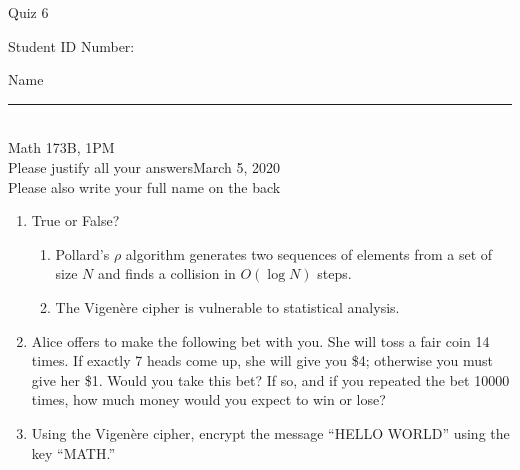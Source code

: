 \documentclass[12pt]{article}
\begin{document}
\begin{flushleft} 
\centerline{\LARGE{Quiz 6}} 
\vspace{5 mm}
{Student ID Number:}\hfill  
{Name \rule {2 in}{0.01in}}\\
Math 173B, 1PM
\\
{Please justify all your answers}\hfill {March 5, 2020}
\\
{Please also write your full name on the back} 

\medskip
\end{flushleft}

\begin{enumerate}
	\item True or False?
	\begin{enumerate}
		\item Pollard's $\rho$ algorithm generates two sequences of elements from a set of size $N$ and finds a collision in $O(\log N)$ steps.
		\item The Vigen\`ere cipher is vulnerable to statistical analysis.
	\end{enumerate}
	\item Alice offers to make the following bet with you. She will toss a fair coin 14 times. If exactly 7 heads come up, she will give you \$4; otherwise you must give her \$1. Would you take this bet? If so, and if you repeated the bet 10000 times, how much money would you expect to win or lose?
	\vfill
	\item Using the Vigen\`ere cipher, encrypt the message ``HELLO WORLD'' using the key ``MATH.''
	\vfill
\end{enumerate}

\end{document}
